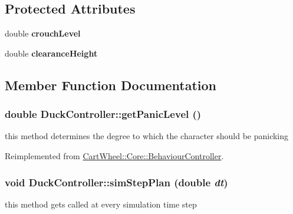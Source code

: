 \subsection*{Protected Attributes}
\begin{DoxyCompactItemize}
\item 
\hypertarget{classCartWheel_1_1Core_1_1DuckController_ad0f4ee22c0dc73cb98f62c5e0756cb90}{
double {\bfseries crouchLevel}}
\label{classCartWheel_1_1Core_1_1DuckController_ad0f4ee22c0dc73cb98f62c5e0756cb90}

\item 
\hypertarget{classCartWheel_1_1Core_1_1DuckController_aca2a9a16d9e21ff5680a24d7cef1050e}{
double {\bfseries clearanceHeight}}
\label{classCartWheel_1_1Core_1_1DuckController_aca2a9a16d9e21ff5680a24d7cef1050e}

\end{DoxyCompactItemize}


\subsection{Member Function Documentation}
\hypertarget{classCartWheel_1_1Core_1_1DuckController_a987ea7a8efaad0f2e3467970909877a6}{
\subsubsection[{getPanicLevel}]{\setlength{\rightskip}{0pt plus 5cm}double DuckController::getPanicLevel ()}}
\label{classCartWheel_1_1Core_1_1DuckController_a987ea7a8efaad0f2e3467970909877a6}
this method determines the degree to which the character should be panicking 

Reimplemented from \hyperlink{classCartWheel_1_1Core_1_1BehaviourController_aa8e43483e51a9cd697fa33a0674abccc}{CartWheel::Core::BehaviourController}.

\hypertarget{classCartWheel_1_1Core_1_1DuckController_a4f3f53ac7bb338a04e8ee8c1152ca12c}{
\subsubsection[{simStepPlan}]{\setlength{\rightskip}{0pt plus 5cm}void DuckController::simStepPlan (double {\em dt})}}
\label{classCartWheel_1_1Core_1_1DuckController_a4f3f53ac7bb338a04e8ee8c1152ca12c}
this method gets called at every simulation time step 

